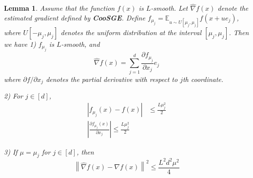\documentclass{article}
\newcommand*{\E}{\mathbb{E}}
\newcommand{\norm}[1]{\left\lVert#1\right\rVert}
\newcommand{\abs}[1]{\left|#1\right|}
\newtheorem{lemma}[theorem]{Lemma}
\theoremstyle{definition}
\theoremstyle{remark}
\begin{document}
\begin{lemma}\label{CooSGE}
Assume that the function $f(x)$ is $L$-smooth. Let $\hat{\nabla} f(x)$ denote the estimated gradient defined by {\bf CooSGE}. Define $f_{\mu_j} = \E_{u\sim U[\mu_j, \mu_j]} f(x+ue_j)$, where $U[-\mu_j,\mu_j]$ denotes the uniform distribution at the interval $[\mu_j, \mu_j]$. Then we have 
1) $f_{\mu_j}$ is $L$-smooth, and 
\begin{equation}
\hat{\nabla} f(x) = \sum_{j=1}^d \frac{\partial f_{\mu_j}}{\partial x_j}e_j
\end{equation} 
where $\partial f/\partial x_j$ denotes the partial derivative with respect to $j$th coordinate.

2) For $j\in [d]$, 
\begin{align}
\abs{f_{\mu_j}(x) - f(x)} &\leq \frac{L\mu_j^2}{2}\\
\abs{\frac{\partial f_{\mu_j}(x)}{\partial x_j}} \leq \frac{L\mu_j^2}{2}
\end{align}
 
 3) If $\mu = \mu_j$ for $j\in [d]$, then 
 \begin{equation}
 \norm{\hat{\nabla} f(x) - {\nabla} f(x)} ^2 \leq \frac{L^2 d^2 \mu^2}{4}
\end{equation}  
\end{lemma}
\end{document}

